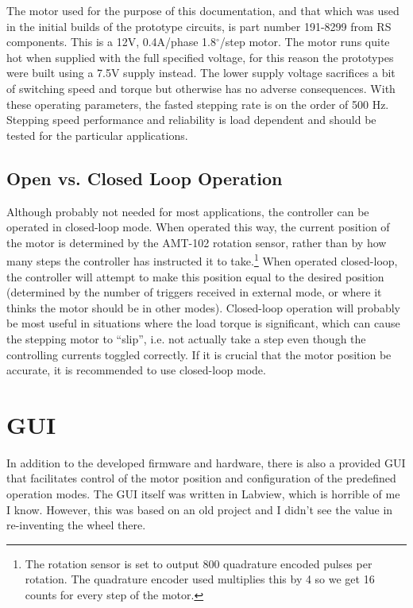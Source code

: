 \documentclass[10pt]{article}
\begin{document}
The motor used for the purpose of this documentation, and that which was used in the initial builds of the prototype circuits, is part number 191-8299 from RS components.  This is a 12V, 0.4A/phase 1.8$^\circ$/step motor.  The motor runs quite hot when supplied with the full specified voltage, for this reason the prototypes were built using a 7.5V supply instead.  The lower supply voltage sacrifices a bit of switching speed and torque but otherwise has no adverse consequences.  With these operating parameters, the fasted stepping rate is on the order of 500 Hz.  Stepping speed performance and reliability is load dependent and should be tested for the particular applications.         

\subsection{Open vs. Closed Loop Operation}
\label{Open_vs_Closed} 
Although probably not needed for most applications, the controller can be operated in closed-loop mode.  When operated this way, the current position of the motor is determined by the AMT-102 rotation sensor, rather than by how many steps the controller has instructed it to take.\footnote{The rotation sensor is set to output 800 quadrature encoded pulses per rotation.  The quadrature encoder used multiplies this by 4 so we get 16 counts for every step of the motor.}  When operated closed-loop, the controller will attempt to make this position equal to the desired position (determined by the number of triggers received in external mode, or where it thinks the motor should be in other modes).  Closed-loop operation will probably be most useful in situations where the load torque is significant, which can cause the stepping motor to ``slip'', i.e. not actually take a step even though the controlling currents toggled correctly.  If it is crucial that the motor position be accurate, it is recommended to use closed-loop mode.    

\FloatBarrier
\newpage
\section{GUI} 
\label{GUI}    

In addition to the developed firmware and hardware, there is also a provided GUI that facilitates control of the motor position and configuration of the predefined operation modes.  The GUI itself was written in Labview, which is horrible of me I know.  However, this was based on an old project and I didn't see the value in re-inventing the wheel there.    
\end{document}
